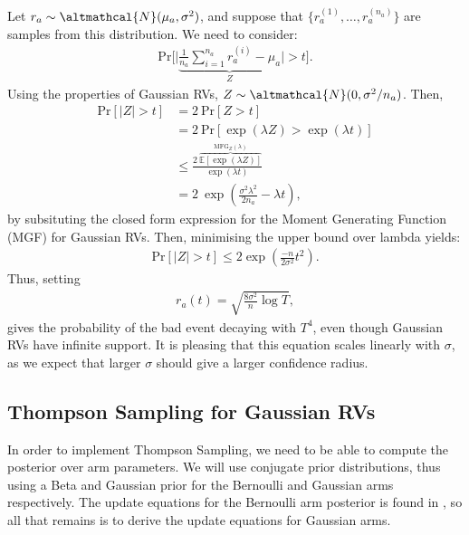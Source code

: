 \documentclass[a4paper]{article}
\begin{document}
	Let $r_a \sim \altmathcal{N}(\mu_a, \sigma^2)$, and suppose that $\lbrace r_a^{(1)}, \ldots, r_a^{(n_a)} \rbrace$ are samples from this distribution. We need to consider:
	\begin{align}
	\text{Pr}\Big[ \Big| \underbrace{\frac{1}{n_a} \sum_{i=1}^{n_a} r_a^{(i)} - \mu_a}_{Z} \Big| > t \Big].
	\end{align}
	Using the properties of Gaussian RVs, $Z \sim \altmathcal{N}(0, \sigma^2 / n_a)$. Then, 
	\begin{align}
	\text{Pr}[|Z| > t] &= 2\ \text{Pr}[Z > t] \tag*{(Symmetry)} \\
	&= 2\ \text{Pr}[\exp(\lambda Z) > \exp(\lambda t)] \tag*{(For $\lambda > 0$)} \\
	&\leq \frac{2\  \overbrace{\mathbb{E}[\exp(\lambda Z)]}^{\text{MFG}_Z(\lambda)}}{\exp(\lambda t)} \tag*{(Markov's Inequality)} \\
	&= 2\ \exp(\frac{\sigma^2 \lambda^2}{2 n_a} - \lambda t),
	\end{align}
	by subsituting the closed form expression for the Moment Generating Function (MGF) for Gaussian RVs. Then, minimising the upper bound over lambda yields:
	\begin{align}
	\text{Pr}[|Z| > t] \leq 2 \exp(\frac{-n}{2\sigma^2} t^2).
	\end{align}
	Thus, setting
	\begin{align}
	r_a(t) = \sqrt{\frac{8 \sigma^2}{n} \log T}, \label{gaussian_rad}
	\end{align}
	gives the probability of the bad event decaying with $T^4$, even though Gaussian RVs have infinite support. It is pleasing that this equation scales linearly with $\sigma$, as we expect that larger $\sigma$ should give a larger confidence radius. 
	
	\subsection{Thompson Sampling for Gaussian RVs}
	In order to implement Thompson Sampling, we need to be able to compute the posterior over arm parameters. We will use conjugate prior distributions, thus using a Beta and Gaussian prior for the Bernoulli and Gaussian arms respectively. The update equations for the Bernoulli arm posterior is found in \cite{thompson}, so all that remains is to derive the update equations for Gaussian arms.
	
\end{document}
